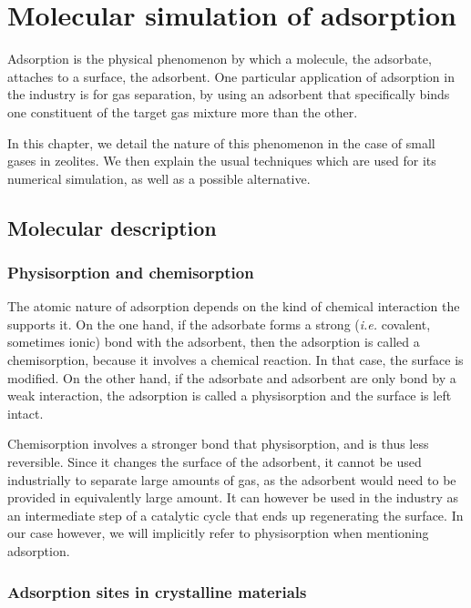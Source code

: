 \documentclass[main.tex]{subfiles}
\begin{document}
\chapter{Molecular simulation of adsorption}\label{adsorption}
\clearpage

Adsorption is the physical phenomenon by which a molecule, the adsorbate, attaches to a surface, the adsorbent. One particular application of adsorption in the industry is for gas separation, by using an adsorbent that specifically binds one constituent of the target gas mixture more than the other.

In this chapter, we detail the nature of this phenomenon in the case of small gases in zeolites. We then explain the usual techniques which are used for its numerical simulation, as well as a possible alternative.

\section{Molecular description}

\subsection{Physisorption and chemisorption}

The atomic nature of adsorption depends on the kind of chemical interaction the supports it. On the one hand, if the adsorbate forms a strong (\textit{i.e.} covalent, sometimes ionic) bond with the adsorbent, then the adsorption is called a chemisorption, because it involves a chemical reaction. In that case, the surface is modified. On the other hand, if the adsorbate and adsorbent are only bond by a weak interaction, the adsorption is called a physisorption and the surface is left intact.

Chemisorption involves a stronger bond that physisorption, and is thus less reversible. Since it changes the surface of the adsorbent, it cannot be used industrially to separate large amounts of gas, as the adsorbent would need to be provided in equivalently large amount. It can however be used in the industry as an intermediate step of a catalytic cycle that ends up regenerating the surface. In our case however, we will implicitly refer to physisorption when mentioning adsorption.

\subsection{Adsorption sites in crystalline materials}
\end{document}
